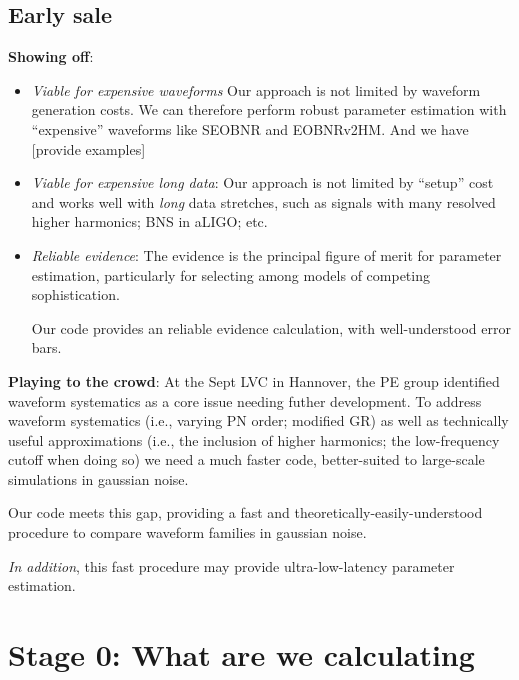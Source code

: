 \documentclass[twocolumn,prd,nofootinbib]{revtex4}
\begin{document}
\subsection{Early sale}

\noindent \textbf{Showing off}:
\begin{itemize}
\item \emph{Viable for expensive waveforms} Our approach is not limited by waveform generation costs.  We can therefore perform
robust parameter estimation with ``expensive'' waveforms like SEOBNR and EOBNRv2HM.  And we have [provide examples]

\item \emph{Viable for expensive long data}: Our approach is not limited by ``setup'' cost and works well with \emph{long} data
  stretches, such as signals with many resolved higher harmonics; BNS in aLIGO; etc.

\item \emph{Reliable evidence}: The evidence is the principal figure of merit for parameter estimation,
particularly for selecting among models of competing sophistication.   

Our code provides an  reliable evidence calculation, with well-understood error bars.
\end{itemize}


\noindent \textbf{Playing to the crowd}: At the Sept LVC in Hannover, the PE group identified waveform systematics as a
core issue needing futher development.  To address waveform systematics (i.e., varying PN order; modified GR) as well as
technically useful approximations (i.e., the inclusion of higher harmonics; the low-frequency cutoff when doing so) we
need a much faster code, better-suited to large-scale simulations in gaussian noise. 

Our code meets this gap, providing a fast and theoretically-easily-understood procedure to compare waveform families in
gaussian noise.  

\emph{In addition}, this fast procedure may provide ultra-low-latency parameter estimation.

\section{Stage 0: What are we calculating}
\end{document}

